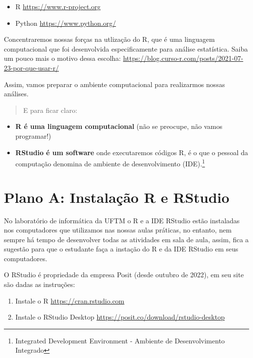 \documentclass[
]{book}
\begin{document}
\begin{itemize}
\item
  R \url{https://www.r-project.org}
\item
  Python \url{https://www.python.org/}
\end{itemize}

Concentraremos nossas forças na utlização do R, que é uma linguagem computacional que foi desenvolvida especificamente para análise estatística. Saiba um pouco mais o motivo dessa escolha: \url{https://blog.curso-r.com/posts/2021-07-23-por-que-usar-r/}

Assim, vamos preparar o ambiente computacional para realizarmos nossas análises.

\begin{quote}
E para ficar claro:
\end{quote}

\begin{itemize}
\item
  \textbf{R é uma linguagem computacional} (não se preocupe, não vamos programar!)
\item
  \textbf{RStudio é um software} onde executaremos códigos R, é o que o pessoal da computação denomina de ambiente de desenvolvimento (IDE).\footnote{Integrated Development Environment - Ambiente de Desenvolvimento Integrado}
\end{itemize}

\section{Plano A: Instalação R e RStudio}\label{plano-a-instalauxe7uxe3o-r-e-rstudio}

No laboratório de informática da UFTM o R e a IDE RStudio estão instaladas nos computadores que utilizamos nas nossas aulas práticas, no entanto, nem sempre há tempo de desenvolver todas as atividades em sala de aula, assim, fica a sugestão para que o estudante faça a instação do R e da IDE RStudio em seus computadores.

O RStudio é propriedade da empresa Posit (desde outubro de 2022), em seu site são dadas as instruções:

\begin{enumerate}
\def\labelenumi{\arabic{enumi}.}
\item
  Instale o R \url{https://cran.rstudio.com}
\item
  Instale o RStudio Desktop \url{https://posit.co/download/rstudio-desktop}
\end{enumerate}
\end{document}
